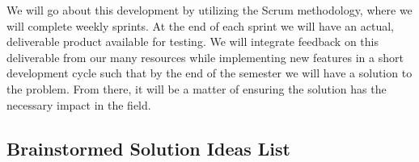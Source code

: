 \documentclass[openright]{report}
\begin{document}
\par We will go about this development by utilizing the Scrum methodology, where we will complete weekly sprints. At the end of each sprint we will have an actual, deliverable product available for testing. We will integrate feedback on this deliverable from our many resources while implementing new features in a short development cycle such that by the end of the semester we will have a solution to the problem. From there, it will be a matter of ensuring the solution has the necessary impact in the field.


\begin{appendices}
\chapter{Brainstormed Solution Ideas List}


\end{appendices}
\end{document}
